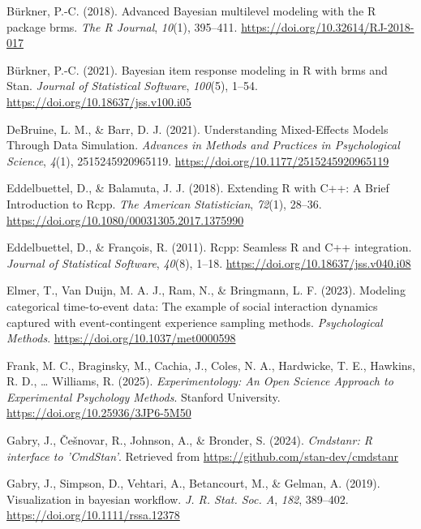 \documentclass[
  man, donotrepeattitle,floatsintext]{apa6}
\newlength{\cslhangindent}
\newenvironment{CSLReferences}[2] %
 {\begin{list}{}{%
  \setlength{\itemindent}{0pt}
  \setlength{\leftmargin}{0pt}
  \setlength{\parsep}{0pt}
  \ifodd #1
   \setlength{\leftmargin}{\cslhangindent}
   \setlength{\itemindent}{-1\cslhangindent}
  \fi
  \setlength{\itemsep}{#2\baselineskip}}}
 {\end{list}}
\begin{document}
\begin{CSLReferences}{1}{0}
Bürkner, P.-C. (2018). Advanced {Bayesian} multilevel modeling with the {R} package {brms}. \emph{The R Journal}, \emph{10}(1), 395--411. \url{https://doi.org/10.32614/RJ-2018-017}

Bürkner, P.-C. (2021). Bayesian item response modeling in {R} with {brms} and {Stan}. \emph{Journal of Statistical Software}, \emph{100}(5), 1--54. \url{https://doi.org/10.18637/jss.v100.i05}

DeBruine, L. M., \& Barr, D. J. (2021). Understanding {Mixed-Effects Models Through Data Simulation}. \emph{Advances in Methods and Practices in Psychological Science}, \emph{4}(1), 2515245920965119. \url{https://doi.org/10.1177/2515245920965119}

Eddelbuettel, D., \& Balamuta, J. J. (2018). {Extending {R} with {C++}: A Brief Introduction to {Rcpp}}. \emph{The American Statistician}, \emph{72}(1), 28--36. \url{https://doi.org/10.1080/00031305.2017.1375990}

Eddelbuettel, D., \& François, R. (2011). {Rcpp}: Seamless {R} and {C++} integration. \emph{Journal of Statistical Software}, \emph{40}(8), 1--18. \url{https://doi.org/10.18637/jss.v040.i08}

Elmer, T., Van Duijn, M. A. J., Ram, N., \& Bringmann, L. F. (2023). Modeling categorical time-to-event data: {The} example of social interaction dynamics captured with event-contingent experience sampling methods. \emph{Psychological Methods}. \url{https://doi.org/10.1037/met0000598}

Frank, M. C., Braginsky, M., Cachia, J., Coles, N. A., Hardwicke, T. E., Hawkins, R. D., \ldots{} Williams, R. (2025). \emph{{Experimentology: An Open Science Approach to Experimental Psychology Methods}}. Stanford University. \url{https://doi.org/10.25936/3JP6-5M50}

Gabry, J., Češnovar, R., Johnson, A., \& Bronder, S. (2024). \emph{Cmdstanr: R interface to 'CmdStan'}. Retrieved from \url{https://github.com/stan-dev/cmdstanr}

Gabry, J., Simpson, D., Vehtari, A., Betancourt, M., \& Gelman, A. (2019). Visualization in bayesian workflow. \emph{J. R. Stat. Soc. A}, \emph{182}, 389--402. \url{https://doi.org/10.1111/rssa.12378}


\end{CSLReferences}
\end{document}
